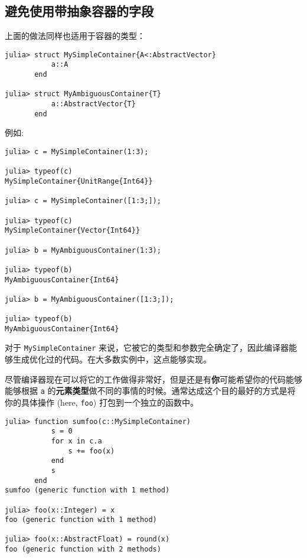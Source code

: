 \hypertarget{1665323452340421493}{}


\subsection{避免使用带抽象容器的字段}



上面的做法同样也适用于容器的类型：




\begin{verbatim}
julia> struct MySimpleContainer{A<:AbstractVector}
           a::A
       end

julia> struct MyAmbiguousContainer{T}
           a::AbstractVector{T}
       end
\end{verbatim}



例如:




\begin{verbatim}
julia> c = MySimpleContainer(1:3);

julia> typeof(c)
MySimpleContainer{UnitRange{Int64}}

julia> c = MySimpleContainer([1:3;]);

julia> typeof(c)
MySimpleContainer{Vector{Int64}}

julia> b = MyAmbiguousContainer(1:3);

julia> typeof(b)
MyAmbiguousContainer{Int64}

julia> b = MyAmbiguousContainer([1:3;]);

julia> typeof(b)
MyAmbiguousContainer{Int64}
\end{verbatim}



对于 \texttt{MySimpleContainer} 来说，它被它的类型和参数完全确定了，因此编译器能够生成优化过的代码。在大多数实例中，这点能够实现。



尽管编译器现在可以将它的工作做得非常好，但是还是有\textbf{你}可能希望你的代码能够能够根据 \texttt{a} 的\textbf{元素类型}做不同的事情的时候。通常达成这个目的最好的方式是将你的具体操作 (here, \texttt{foo}) 打包到一个独立的函数中。




\begin{verbatim}
julia> function sumfoo(c::MySimpleContainer)
           s = 0
           for x in c.a
               s += foo(x)
           end
           s
       end
sumfoo (generic function with 1 method)

julia> foo(x::Integer) = x
foo (generic function with 1 method)

julia> foo(x::AbstractFloat) = round(x)
foo (generic function with 2 methods)
\end{verbatim}



